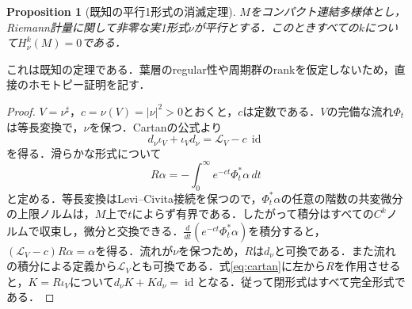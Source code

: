 \documentclass[12pt]{amsart}
\newtheorem{prop}[thm]{Proposition}
\theoremstyle{definition}
\theoremstyle{remark}
\numberwithin{equation}{section}
\newcommand{\cL}{\mathcal{L}}
\DeclareMathOperator{\id}{id}
\begin{document}
\begin{prop}[既知の平行1形式の消滅定理]\label{prop:vanishing}
$M$をコンパクト連結多様体とし，Riemann計量に関して非零な実1形式$\nu$が平行とする．このときすべての$k$について$H^k_\nu(M)=0$である．
\end{prop}
これは既知の定理である\cite[Theorem 3.15]{LLMP}．葉層のregular性や周期群のrankを仮定しないため，直接のホモトピー証明を記す．
\begin{proof}
$V=\nu^\sharp$，$c=\nu(V)=|\nu|^2>0$とおくと，$c$は定数である．$V$の完備な流れ$\Phi_t$は等長変換で，$\nu$を保つ．Cartanの公式より
\begin{equation}\label{eq:cartan}
 d_\nu\iota_V+\iota_Vd_\nu=\cL_V-c\,\id
\end{equation}
を得る．滑らかな形式について
\[
 R\alpha=-\int_0^\infty e^{-ct}\Phi_t^*\alpha\,dt
\]
と定める．等長変換はLevi--Civita接続を保つので，$\Phi_t^*\alpha$の任意の階数の共変微分の上限ノルムは，$M$上で$t$によらず有界である．したがって積分はすべての$C^k$ノルムで収束し，微分と交換できる．$\frac{d}{dt}(e^{-ct}\Phi_t^*\alpha)$を積分すると，$(\cL_V-c)R\alpha=\alpha$を得る．流れが$\nu$を保つため，$R$は$d_\nu$と可換である．また流れの積分による定義から$\cL_V$とも可換である．式\eqref{eq:cartan}に左から$R$を作用させると，$K=R\iota_V$について$d_\nu K+Kd_\nu=\id$となる．従って閉形式はすべて完全形式である．
\end{proof}
\end{document}
